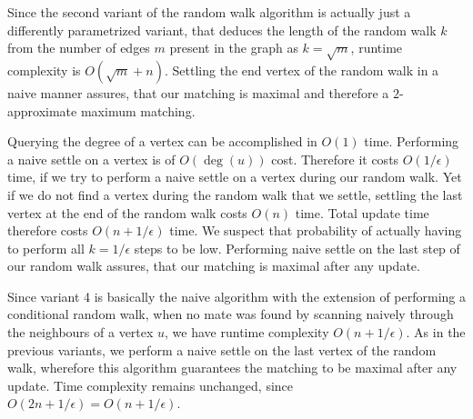 \documentclass{article}      %
\newcommand\todo[1]{\textcolor{blue}{\textbf{todo: }#1}}
\begin{document}
Since the second variant of the random walk algorithm is actually just a differently parametrized variant, that deduces the length of the random walk $k$ from the number of edges $m$ present in the graph as $k=\sqrt{m}$, runtime complexity is $O(\sqrt{m}+n)$. Settling the end vertex of the random walk in a naive manner assures, that our matching is maximal and therefore a $2$-approximate maximum matching.

Querying the degree of a vertex can be accomplished in $O(1)$ time. Performing a naive settle on a vertex is of $O(\deg(u))$ cost. Therefore it costs $O(1/\epsilon)$ time, if we try to perform a naive settle on a vertex during our random walk. Yet if we do not find a vertex during the random walk that we settle, settling the last vertex at the end of the random walk costs $O(n)$ time. Total update time therefore costs $O(n + 1/\epsilon)$ time. We suspect that probability of actually having to perform all $k=1/\epsilon$ steps to be low. Performing naive settle on the last step of our random walk assures, that our matching is maximal after any update.

Since variant 4 is basically the naive algorithm with the extension of performing a conditional random walk, when no mate was found by scanning naively through the neighbours of a vertex $u$, we have runtime complexity $O(n + 1/\epsilon)$. As in the previous variants, we perform a naive settle on the last vertex of the random walk, wherefore this algorithm guarantees the matching to be maximal after any update. Time complexity remains unchanged, since $O(2n + 1/\epsilon) = O(n + 1/\epsilon)$. 



\end{document}
